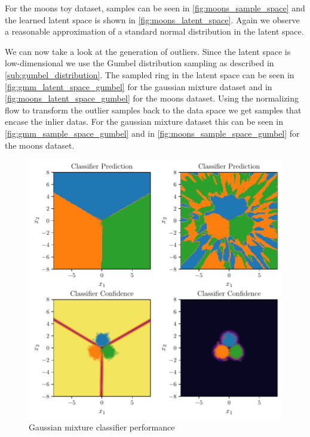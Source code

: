 For the moons toy dataset, samples can be seen in
\autoref{fig:moons_sample_space} and the learned latent space is shown in
\autoref{fig:moons_latent_space}. Again we observe a reasonable approximation
of a standard normal distribution in the latent space.

We can now take a look at the generation of outliers. Since the latent space is
low-dimensional we use the Gumbel distribution sampling as described in
\autoref{sub:gumbel_distribution}. The sampled ring in
the latent space can be seen in \autoref{fig:gmm_latent_space_gumbel} for the
gaussian mixture dataset and in \autoref{fig:moons_latent_space_gumbel} for the
moons dataset. Using the normalizing flow to transform the outlier samples back
to the data space we get samples that encase the inlier datas. For the gaussian
mixture dataset this can be seen in \autoref{fig:gmm_sample_space_gumbel} and
in \autoref{fig:moons_sample_space_gumbel} for the moons dataset.

\begin{figure}[htpb]
	\centering
        \includegraphics{figures/toy_example/gaussian_mixture/classifier.pdf}
	\caption{Gaussian mixture classifier performance}%
	\label{fig:classifier_gmm}
\end{figure}

